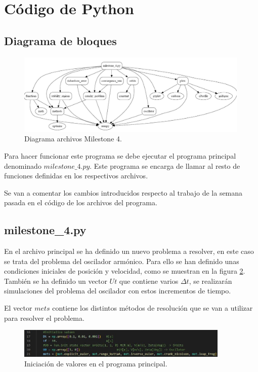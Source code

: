 \documentclass[12pt,a4paper]{article}
\begin{document}
\section{Código de Python}
\subsection{Diagrama de bloques}
\begin{figure}[H]
	\centering
	\includegraphics[width=0.99\textwidth]{FIGURES/mil4/codigo/diagram_milst4.JPG}
	\caption{Diagrama archivos Milestone 4.}
	\label{diagram}
\end{figure}

Para hacer funcionar este programa se debe ejecutar el programa principal denominado $milestone\_4.py$. Este programa se encarga de llamar al resto de funciones definidas en los respectivos archivos.

Se van a comentar los cambios introducidos respecto al trabajo de la semana pasada en el código de los archivos del programa.


\subsection{milestone\_4.py}
En el archivo principal se ha definido un nuevo problema a resolver, en este caso se trata del problema del oscilador armónico. Para ello se han definido unas condiciones iniciales de posición y velocidad, como se muestran en la figura \ref{main2}. También se ha definido un vector $Ut$ que contiene varios $\Delta t$, se realizarán simulaciones del problema del oscilador con estos incrementos de tiempo. 

El vector $mets$ contiene los distintos métodos de resolución que se van a utilizar para resolver el problema. 
\begin{figure}[H]
	\centering
	\includegraphics[width=0.9\textwidth]{FIGURES/mil4/codigo/main2.JPG}
	\caption{Iniciación de valores en el programa principal.}
	\label{main2}
\end{figure}
\end{document}
